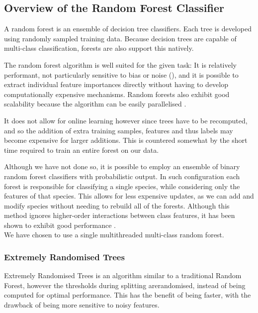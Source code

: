 \subsection{Overview of the Random Forest Classifier}
A random forest \parencite{breiman2001} is an ensemble of decision tree classifiers.
Each tree is developed using randomly sampled training data.
Because decision trees are capable of multi-class classification,
forests are also support this natively.

The random forest algorithm is well suited for the given task:
It is relatively performant, not particularly sensitive to bias or noise
(\textcite{marko2004}),
and it is possible to extract individual feature importances directly without
having to develop computationally expensive mechanisms.
Random forests also exhibit good scalability because the algorithm can be easily
parallelised \parencite{breiman2001}.

It does not allow for online learning however since trees have to be recomputed, 
and so the addition of extra training samples, features and thus labels may
become expensive for larger additions.
This is countered somewhat by the short time required to train an entire forest
on our data.

Although we have not done so, it is possible to employ an ensemble of binary
random forest classifiers with probabilistic output.
In such configuration each forest is responsible for classifying a single
species, while considering only the features of that species.
This allows for less expensive updates, as we can add and modify species without
needing to rebuild all of the forests.
Although this method ignores higher-order interactions between class features,
it has been shown to exhibit good performance \parencite{lasseck2013}.\\

We have chosen to use a single multithreaded multi-class random forest.


\subsubsection{Extremely Randomised Trees}
Extremely Randomised Trees \parencite{geurt2006} is an algorithm similar to a
traditional Random Forest, however the thresholds during splitting arerandomised,
instead of being computed for optimal performance.
This has the benefit of being faster, with the drawback of being more sensitive
to noisy features.\\


